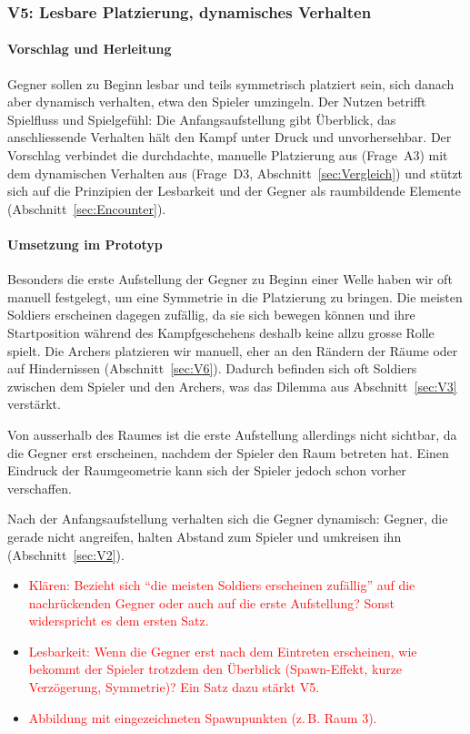 \documentclass[../Main.tex]{subfiles}
\begin{document}
\subsubsection{V5: Lesbare Platzierung, dynamisches Verhalten} \label{sec:V5}

\paragraph{Vorschlag und Herleitung}
Gegner sollen zu Beginn lesbar und teils symmetrisch platziert sein, sich danach aber dynamisch verhalten, etwa den Spieler umzingeln. Der Nutzen betrifft Spielfluss und Spielgefühl: Die Anfangsaufstellung gibt Überblick, das anschliessende Verhalten hält den Kampf unter Druck und unvorhersehbar. Der Vorschlag verbindet die durchdachte, manuelle Platzierung aus  (Frage~A3) mit dem dynamischen Verhalten aus  (Frage~D3, Abschnitt~\ref{sec:Vergleich}) und stützt sich auf die Prinzipien der Lesbarkeit und der Gegner als raumbildende Elemente (Abschnitt~\ref{sec:Encounter}).

\paragraph{Umsetzung im Prototyp}
Besonders die erste Aufstellung der Gegner zu Beginn einer Welle haben wir oft manuell festgelegt, um eine Symmetrie in die Platzierung zu bringen. Die meisten Soldiers erscheinen dagegen zufällig, da sie sich bewegen können und ihre Startposition während des Kampfgeschehens deshalb keine allzu grosse Rolle spielt. Die Archers platzieren wir manuell, eher an den Rändern der Räume oder auf Hindernissen (Abschnitt~\ref{sec:V6}). Dadurch befinden sich oft Soldiers zwischen dem Spieler und den Archers, was das Dilemma aus Abschnitt~\ref{sec:V3} verstärkt.

Von ausserhalb des Raumes ist die erste Aufstellung allerdings nicht sichtbar, da die Gegner erst erscheinen, nachdem der Spieler den Raum betreten hat. Einen Eindruck der Raumgeometrie kann sich der Spieler jedoch schon vorher verschaffen.

Nach der Anfangsaufstellung verhalten sich die Gegner dynamisch: Gegner, die gerade nicht angreifen, halten Abstand zum Spieler und umkreisen ihn (Abschnitt~\ref{sec:V2}).

\begin{itemize}[leftmargin=1.5cm]
    \item \textcolor{red}{Klären: Bezieht sich \enquote{die meisten Soldiers erscheinen zufällig} auf die nachrückenden Gegner oder auch auf die erste Aufstellung? Sonst widerspricht es dem ersten Satz.}
    \item \textcolor{red}{Lesbarkeit: Wenn die Gegner erst nach dem Eintreten erscheinen, wie bekommt der Spieler trotzdem den Überblick (Spawn-Effekt, kurze Verzögerung, Symmetrie)? Ein Satz dazu stärkt V5.}
    \item \textcolor{red}{Abbildung mit eingezeichneten Spawnpunkten (z.\,B. Raum 3).}
\end{itemize}
\end{document}
